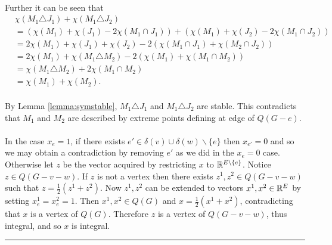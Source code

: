 \documentclass[preprint]{elsarticle}
\newenvironment{proof}{{\bf Proof:  }}{\hfill\rule{2mm}{2mm}}
\begin{document}
\begin{proof}
\paragraph{}
Further it can be seen that
\begin{align*}
&\chi(M_1 \triangle J_1) + \chi(M_1 \triangle J_2)\\
&= (\chi(M_1) + \chi(J_1) - 2\chi(M_1 \cap J_1)) + (\chi(M_1) + \chi(J_2) -2\chi(M_1 \cap J_2))\\
&=2\chi(M_1) + \chi(J_1) + \chi(J_2) -2(\chi(M_1 \cap J_1) + \chi(M_2 \cap J_2)) \\
&= 2\chi(M_1) + \chi(M_1 \triangle M_2) - 2(\chi(M_1) + \chi(M_1 \cap M_2)) \\
&= \chi(M_1 \triangle M_2) + 2\chi(M_1 \cap M_2) \\
&=\chi(M_1) + \chi(M_2).
\end{align*}
\paragraph{}By Lemma \ref{lemma:symstable}, $M_1 \triangle J_1$ and $M_1 \triangle J_2$ are stable. This contradicts that $M_1$ and $M_2$ are described by extreme points defining at edge of $Q(G-e)$.
\paragraph{}
In the case $x_e = 1$, if there exists $e' \in \delta(v) \cup \delta(w) \backslash \{e\}$ then $x_{e'} = 0$ and so we may obtain a contradiction by removing $e'$ as we did in the $x_e = 0$ case. Otherwise let $z$ be the vector acquired by restricting $x$ to $\mathbb{R}^{E \backslash \{e\}}$. Notice $z \in Q(G - v - w)$. If $z$ is not a vertex then there exists $z^1, z^2 \in Q(G-v-w)$ such that $z = \frac{1}{2}(z^1 + z^2)$. Now $z^1,z^2$ can be extended to vectors $x^1, x^2 \in \mathbb{R}^{E}$ by setting $x^1_e=x^2_e = 1$. Then $x^1,x^2 \in Q(G)$ and $x = \frac{1}{2}(x^1 + x^2)$, contradicting that $x$ is a vertex of $Q(G)$. Therefore $z$ is a vertex of $Q(G-v-w)$, thus integral, and so $x$ is integral.
\end{proof}

\end{document}
